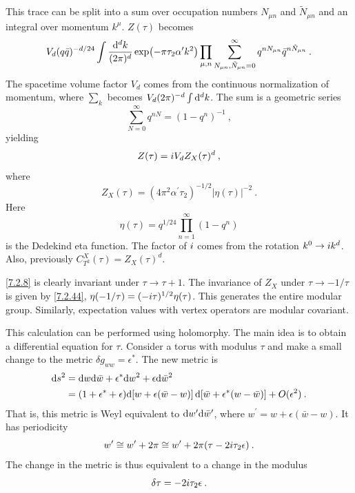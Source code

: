 This trace can be split into a sum over occupation numbers $N_{\mu n}$ and $\tilde{N}_{\mu n}$ and an integral over momentum $k^{\mu}$. 
$Z(\tau)$ becomes 
\begin{equation}
	V_{d}(q \bar{q})^{-d / 24} \int \frac{\mathrm{d}^{d} k}{(2 \pi)^{d}} \exp(-\pi \tau_{2} \alpha^{\prime} k^{2}) 
	\prod_{\mu, n} \sum_{N_{\mu n}, \tilde{N}_{\mu n}=0}^{\infty} q^{n N_{\mu n}} \bar{q}^{n \tilde{N}_{\mu n}} \:. \label{7.2.6} 
\end{equation}
The spacetime volume factor $V_{d}$ comes from the continuous normalization of momentum, where $\sum_{k}$ becomes $V_{d}(2 \pi)^{-d} \int \mathrm{d}^{d} k$. 
The sum is a geometric series 
\begin{equation}
	\sum_{N=0}^{\infty} q^{n N}=(1-q^{n})^{-1} \:, \label{7.2.7} 
\end{equation}
yielding 
\begin{equation}
	Z(\tau)=i V_{d} Z_{X}(\tau)^{d} \:, \label{7.2.8} 
\end{equation}
where 
\begin{equation}
	Z_{X}(\tau)= (4 \pi^{2} \alpha^{\prime} \tau_{2})^{-1 / 2}|\eta(\tau)|^{-2} \:. \label{7.2.9} 
\end{equation}
Here 
\begin{equation}
	\eta(\tau)=q^{1 / 24} \prod_{n=1}^{\infty}(1-q^{n}) \label{7.2.10} 
\end{equation}
is the Dedekind eta function. The factor of $i$ comes from the rotation $k^{0} \rightarrow i k^{d}$. Also, previously $C_{T^{2}}^{X}(\tau)=Z_{X}(\tau)^{d}$. 

\eqref{7.2.8} is clearly invariant under $\tau \rightarrow \tau+1$. 
The invariance of $Z_{X}$ under $\tau \rightarrow-1 / \tau$ is given by \eqref{7.2.44}, $\eta(-1 / \tau)=(-i \tau)^{1 / 2} \eta(\tau)$. 
This generates the entire modular group. Similarly, expectation values with vertex operators are modular covariant. 

This calculation can be performed using holomorphy. The main idea is to obtain a differential equation for $\tau$. 
Consider a torus with modulus $\tau$ and make a small change to the metric $\delta g_{w w}=\epsilon^{*}$. 
The new metric is 
\begin{align}
	\mathrm{d} s^{2} &= \mathrm{d} w \mathrm{d} \bar{w}+\epsilon^{*} \mathrm{d} w^{2}+\epsilon \mathrm{d} \bar{w}^{2}  \nonumber \\
	&=(1+\epsilon^{*}+\epsilon) \mathrm{d}[w+\epsilon(\bar{w}-w)]\, \mathrm{d}[\bar{w}+\epsilon^{*}(w-\bar{w})]+O(\epsilon^{2}) \:. \label{7.2.11} 
\end{align}
That is, this metric is Weyl equivalent to $\mathrm{d} w^{\prime} \mathrm{d} \bar{w}^{\prime}$, where $w^{\prime}=w+\epsilon(\bar{w}-w)$. It has periodicity 
\begin{equation}
	w^{\prime} \cong w^{\prime}+2 \pi \cong w^{\prime}+2 \pi(\tau-2 i \tau_{2} \epsilon) \:. \label{7.2.12} 
\end{equation}
The change in the metric is thus equivalent to a change in the modulus 
\begin{equation}
	\delta \tau=-2 i \tau_{2} \epsilon \:. \label{7.2.13} 
\end{equation}

